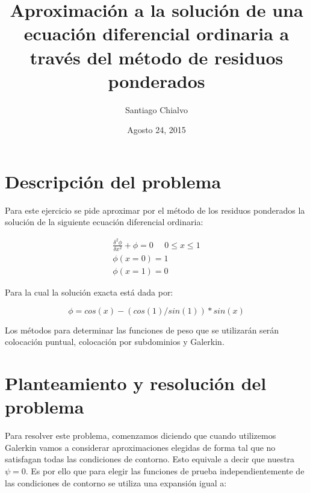 \documentclass[11pt]{article}
\title{\textbf{Aproximaci\'on a la soluci\'on de una ecuaci\'on diferencial ordinaria a trav\'es del m\'etodo de residuos ponderados}}
\author{Santiago Chialvo}
\date{Agosto 24, 2015}
\begin{document}

\maketitle


\section{Descripci\'on del problema}

Para este ejercicio se pide aproximar por el m\'etodo de los residuos ponderados la soluci\'on de la siguiente ecuaci\'on diferencial ordinaria:

\begin{equation}
\begin{aligned}
\frac{\delta^2\phi}{\delta x^2} + \phi = 0 \ \ \ \ \ \ 0 \leq x \leq 1 \\
\phi(x = 0) = 1 \\
\phi(x = 1) = 0
\end{aligned}
\end{equation}

\bigskip Para la cual la soluci\'on exacta est\'a dada por:

\begin{equation}
\phi = cos(x) - (cos(1)/sin(1))*sin(x)
\end{equation}

\bigskip Los m\'etodos para determinar las funciones de peso que se utilizar\'an ser\'an colocaci\'on puntual, colocaci\'on por subdominios y Galerkin. \bigskip

\section{Planteamiento y resoluci\'on del problema}

Para resolver este problema, comenzamos diciendo que cuando utilizemos Galerkin vamos a considerar aproximaciones elegidas de forma tal que no satisfagan todas las condiciones de contorno. Esto equivale a decir que nuestra $\psi = 0$. Es por ello que para elegir las funciones de prueba independientemente de las condiciones de contorno se utiliza una expansi\'on igual a:
\end{document}

